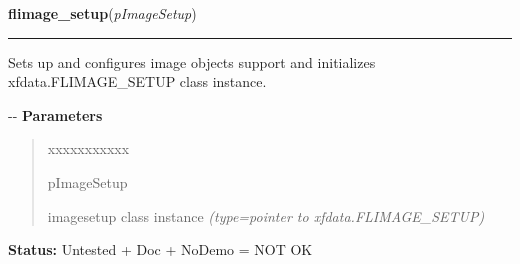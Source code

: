 \hspace{.8\funcindent}\begin{boxedminipage}{\funcwidth}

    \raggedright \textbf{flimage\_setup}(\textit{pImageSetup})

    \vspace{-1.5ex}

    \rule{\textwidth}{0.5\fboxrule}
\setlength{\parskip}{2ex}

Sets up and configures image objects support and initializes
xfdata.FLIMAGE\_SETUP class instance.

-{}-
\setlength{\parskip}{1ex}
      \textbf{Parameters}
      \vspace{-1ex}

      \begin{quote}
        \begin{Ventry}{xxxxxxxxxxx}

          \item[pImageSetup]


imagesetup class instance
            {\it (type=pointer to xfdata.FLIMAGE\_SETUP)}

        \end{Ventry}

      \end{quote}

\textbf{Status:} 
Untested + Doc + NoDemo = NOT OK


    \end{boxedminipage}

    \label{xformslib:flflimage:flimage_load}

    \vspace{0.5ex}

